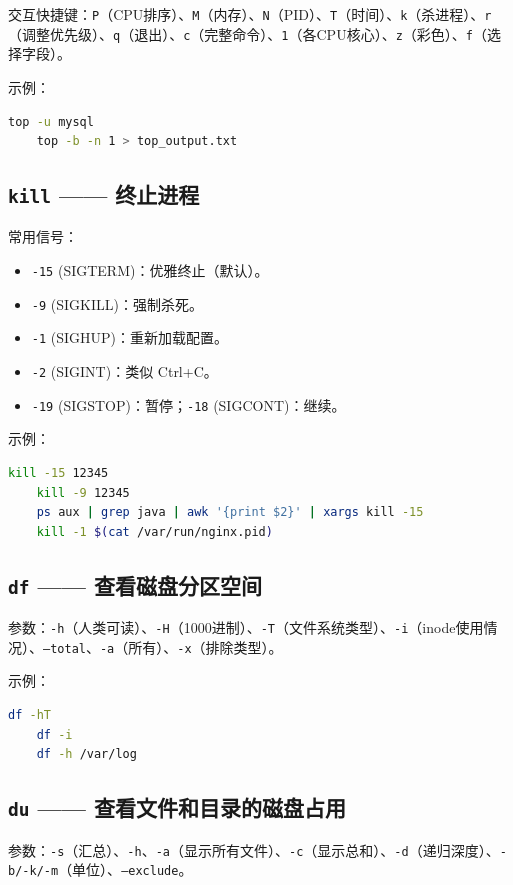 交互快捷键：\texttt{P}（CPU排序）、\texttt{M}（内存）、\texttt{N}（PID）、\texttt{T}（时间）、\texttt{k}（杀进程）、\texttt{r}（调整优先级）、\texttt{q}（退出）、\texttt{c}（完整命令）、\texttt{1}（各CPU核心）、\texttt{z}（彩色）、\texttt{f}（选择字段）。

示例：
\begin{lstlisting}[language=bash]
	top -u mysql
	top -b -n 1 > top_output.txt
\end{lstlisting}

\subsection*{\texttt{kill} —— 终止进程} 常用信号：
\begin{itemize}
\item \texttt{-15} (SIGTERM)：优雅终止（默认）。
\item \texttt{-9} (SIGKILL)：强制杀死。
\item \texttt{-1} (SIGHUP)：重新加载配置。
\item \texttt{-2} (SIGINT)：类似 Ctrl+C。
\item \texttt{-19} (SIGSTOP)：暂停；\texttt{-18} (SIGCONT)：继续。
\end{itemize}

示例：
\begin{lstlisting}[language=bash]
	kill -15 12345
	kill -9 12345
	ps aux | grep java | awk '{print $2}' | xargs kill -15
	kill -1 $(cat /var/run/nginx.pid)
\end{lstlisting}

\subsection*{\texttt{df} —— 查看磁盘分区空间} 参数：\texttt{-h}（人类可读）、\texttt{-H}（1000进制）、\texttt{-T}（文件系统类型）、\texttt{-i}（inode使用情况）、\texttt{--total}、\texttt{-a}（所有）、\texttt{-x}（排除类型）。

示例：
\begin{lstlisting}[language=bash]
	df -hT
	df -i
	df -h /var/log
\end{lstlisting}

\subsection*{\texttt{du} —— 查看文件和目录的磁盘占用} 参数：\texttt{-s}（汇总）、\texttt{-h}、\texttt{-a}（显示所有文件）、\texttt{-c}（显示总和）、\texttt{-d}（递归深度）、\texttt{-b/-k/-m}（单位）、\texttt{--exclude}。

